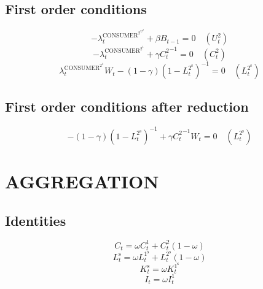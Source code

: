 \subsection{First order conditions}

\begin{equation}
-\lambda^{\mathrm{CONSUMER}^{\mathrm{2}^{\mathrm{U}^{\mathrm{2}}}}}_{t} + {\beta} {B_{t-1}} = 0
 \quad \left(U^{\mathrm{2}}_{t}\right)
\end{equation}
\begin{equation}
-\lambda^{\mathrm{CONSUMER}^{\mathrm{2}^{\mathrm{1}}}}_{t} + {\gamma} {C^{\mathrm{2}}_{t}}^{-1} = 0
 \quad \left(C^{\mathrm{2}}_{t}\right)
\end{equation}
\begin{equation}
{\lambda^{\mathrm{CONSUMER}^{\mathrm{2}^{\mathrm{1}}}}_{t}} {W_{t}} - \left(1 - \gamma\right) \left(1 - L^{\mathrm{2}^{\mathrm{s}}}_{t}\right)^{-1} = 0
 \quad \left(L^{\mathrm{2}^{\mathrm{s}}}_{t}\right)
\end{equation}


\subsection{First order conditions after reduction}

\begin{equation}
-\left(1 - \gamma\right) \left(1 - L^{\mathrm{2}^{\mathrm{s}}}_{t}\right)^{-1} + {\gamma} {C^{\mathrm{2}}_{t}}^{-1} {W_{t}} = 0
 \quad \left(L^{\mathrm{2}^{\mathrm{s}}}_{t}\right)
\end{equation}




\section{AGGREGATION}

\subsection{Identities}

\begin{equation}
C_{t} = {\omega} {C^{\mathrm{1}}_{t}} + {C^{\mathrm{2}}_{t}} \left(1 - \omega\right)
\end{equation}
\begin{equation}
L^{\mathrm{s}}_{t} = {\omega} {L^{\mathrm{1}^{\mathrm{s}}}_{t}} + {L^{\mathrm{2}^{\mathrm{s}}}_{t}} \left(1 - \omega\right)
\end{equation}
\begin{equation}
K^{\mathrm{s}}_{t} = {\omega} {K^{\mathrm{1}^{\mathrm{s}}}_{t}}
\end{equation}
\begin{equation}
I_{t} = {\omega} {I^{\mathrm{1}}_{t}}
\end{equation}




